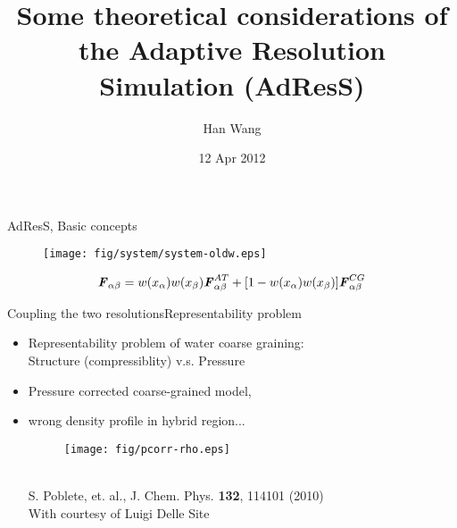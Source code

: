 \documentclass{beamer}
\newcommand{\redc}[1]{{\color{red} #1}}
\newcommand{\bluec}[1]{{\color{blue} #1}}
\renewcommand{\v}[1]{\textbf{\textit{#1}}}
\begin{document}
\title[]{Some theoretical considerations of the Adaptive Resolution Simulation (AdResS)}
%
\author{Han Wang}
\date[12 Apr 2012]{12 Apr 2012}
\frame{\titlepage}

\begin{frame}{AdResS, Basic concepts}
  \begin{figure}
    \centering 
    \texttt{[image: fig/system/system-oldw.eps]}
  \end{figure}
  \begin{equation*}
    {\v F}_{\alpha \beta}=w(x_\alpha)w(x_\beta){\v F}_{\alpha\beta}^{AT}+[1-w(x_\alpha)w(x_\beta)]{\v F}^{CG}_{\alpha\beta}
  \end{equation*}
\end{frame} 

\begin{frame}{Coupling the two resolutions}{Representability problem}
  \begin{itemize}
  \item <1->
    Representability problem of water coarse graining:\\
    \redc{Structure (compressiblity)} v.s.     \redc{Pressure} 
  \item <2->
    Pressure corrected coarse-grained model,\\
  \item <3->
    \bluec{wrong density profile in hybrid region...}
    \begin{minipage}[t]{0.45\linewidth}
      \begin{figure}
        \texttt{[image: fig/pcorr-rho.eps]}\hfill
      \end{figure}
    \end{minipage}\\
    \footnotesize{
      S. Poblete, et. al.,  J. Chem. Phys. \textbf{132}, 114101 (2010)\\
      With courtesy of Luigi Delle Site
    }
  \end{itemize}
\end{frame}
\end{document}
